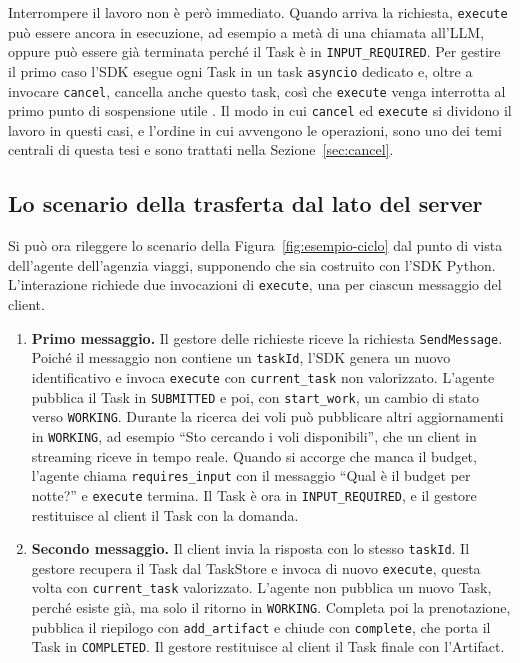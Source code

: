 Interrompere il lavoro non è però immediato. Quando arriva la richiesta, \texttt{execute} può essere ancora in esecuzione, ad esempio a metà di una chiamata all'LLM, oppure può essere già terminata perché il Task è in \texttt{INPUT\_\allowbreak REQUIRED}. Per gestire il primo caso l'SDK esegue ogni Task in un task \texttt{asyncio} dedicato e, oltre a invocare \texttt{cancel}, cancella anche questo task, così che \texttt{execute} venga interrotta al primo punto di sospensione utile \cite{a2apythonsdk}. Il modo in cui \texttt{cancel} ed \texttt{execute} si dividono il lavoro in questi casi, e l'ordine in cui avvengono le operazioni, sono uno dei temi centrali di questa tesi e sono trattati nella Sezione~\ref{sec:cancel}.

\subsection{Lo scenario della trasferta dal lato del server}

Si può ora rileggere lo scenario della Figura~\ref{fig:esempio-ciclo} dal punto di vista dell'agente dell'agenzia viaggi, supponendo che sia costruito con l'SDK Python. L'interazione richiede due invocazioni di \texttt{execute}, una per ciascun messaggio del client.

\begin{enumerate}
    \item \textbf{Primo messaggio.} Il gestore delle richieste riceve la richiesta \texttt{SendMessage}. Poiché il messaggio non contiene un \texttt{taskId}, l'SDK genera un nuovo identificativo e invoca \texttt{execute} con \texttt{current\_task} non valorizzato. L'agente pubblica il Task in \texttt{SUBMITTED} e poi, con \texttt{start\_work}, un cambio di stato verso \texttt{WORKING}. Durante la ricerca dei voli può pubblicare altri aggiornamenti in \texttt{WORKING}, ad esempio ``Sto cercando i voli disponibili'', che un client in streaming riceve in tempo reale. Quando si accorge che manca il budget, l'agente chiama \texttt{requires\_input} con il messaggio ``Qual è il budget per notte?'' e \texttt{execute} termina. Il Task è ora in \texttt{INPUT\_\allowbreak REQUIRED}, e il gestore restituisce al client il Task con la domanda.
    \item \textbf{Secondo messaggio.} Il client invia la risposta con lo stesso \texttt{taskId}. Il gestore recupera il Task dal TaskStore e invoca di nuovo \texttt{execute}, questa volta con \texttt{current\_task} valorizzato. L'agente non pubblica un nuovo Task, perché esiste già, ma solo il ritorno in \texttt{WORKING}. Completa poi la prenotazione, pubblica il riepilogo con \texttt{add\_artifact} e chiude con \texttt{complete}, che porta il Task in \texttt{COMPLETED}. Il gestore restituisce al client il Task finale con l'Artifact.
\end{enumerate}

